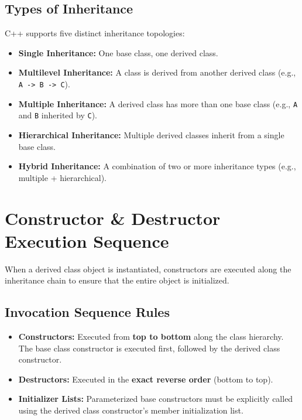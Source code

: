\documentclass[12pt,a4paper]{article}
\begin{document}
\subsection{Types of Inheritance}
C++ supports five distinct inheritance topologies:
\begin{itemize}[leftmargin=*, itemsep=3pt]
  \item \textbf{Single Inheritance:} One base class, one derived class.
  \item \textbf{Multilevel Inheritance:} A class is derived from another derived class (e.g., \texttt{A -> B -> C}).
  \item \textbf{Multiple Inheritance:} A derived class has more than one base class (e.g., \texttt{A} and \texttt{B} inherited by \texttt{C}).
  \item \textbf{Hierarchical Inheritance:} Multiple derived classes inherit from a single base class.
  \item \textbf{Hybrid Inheritance:} A combination of two or more inheritance types (e.g., multiple + hierarchical).
\end{itemize}

\section{Constructor \& Destructor Execution Sequence}

When a derived class object is instantiated, constructors are executed along the inheritance chain to ensure that the entire object is initialized.

\subsection{Invocation Sequence Rules}
\begin{itemize}[leftmargin=*, itemsep=3pt]
  \item \textbf{Constructors:} Executed from \textbf{top to bottom} along the class hierarchy. The base class constructor is executed first, followed by the derived class constructor.
  \item \textbf{Destructors:} Executed in the \textbf{exact reverse order} (bottom to top).
  \item \textbf{Initializer Lists:} Parameterized base constructors must be explicitly called using the derived class constructor's member initialization list.
\end{itemize}
\end{document}
